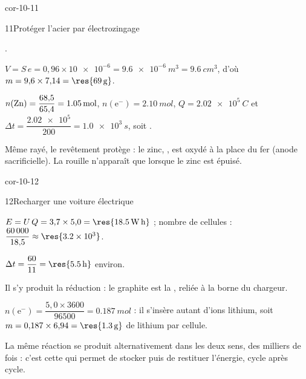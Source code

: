 \begin{blocLivre}{cor-10-11}
\begin{corrige}{11}{Protéger l'acier par électrozingage}
\begin{questions}
\item {}.
\item $V=S\,e=0{,}96\times\num{10e-6}=\qty{9,6e-6}{m^3}=\qty{9,6}{cm^3}$, d'où
$m=9{,}6\times7{,}14=\res{\qty{69}{g}}$.
\item $n(\ce{Zn})=\dfrac{68{,}5}{65{,}4}=\qty{1,05}{mol}$, $n(\mathrm{e}^-)=\qty{2,10}{mol}$,
$Q=\qty{2,02e5}{C}$ et $\Delta t=\dfrac{\num{2.02e5}}{200}=\qty{1,0e3}{s}$, soit .
\item Même rayé, le revêtement protège : le zinc, , est oxydé à la place du fer (anode
sacrificielle). La rouille n'apparaît que lorsque le zinc est épuisé.
\end{questions}
\end{corrige}
\end{blocLivre}
\begin{blocLivre}{cor-10-12}
\begin{corrige}{12}{Recharger une voiture électrique}
\begin{questions}
\item $E=U\,Q=3{,}7\times5{,}0=\res{\qty{18,5}{W.h}}$ ; nombre de cellules :
$\dfrac{\num{60000}}{18{,}5}\approx\res{\num{3,2e3}}$.
\item $\Delta t=\dfrac{60}{11}=\res{\qty{5,5}{h}}$ environ.
\item Il s'y produit la réduction  : le graphite est la , reliée à la
borne \res{-} du chargeur.
\item $n(\mathrm{e}^-)=\dfrac{5{,}0\times3600}{\num{96500}}=\qty{0,187}{mol}$ : il s'insère autant d'ions lithium,
soit $m=0{,}187\times6{,}94=\res{\qty{1,3}{g}}$ de lithium par cellule.
\item La même réaction se produit alternativement dans les deux sens, des milliers de fois : c'est cette
 qui permet de stocker puis de restituer l'énergie, cycle après cycle.
\end{questions}
\end{corrige}
\end{blocLivre}
